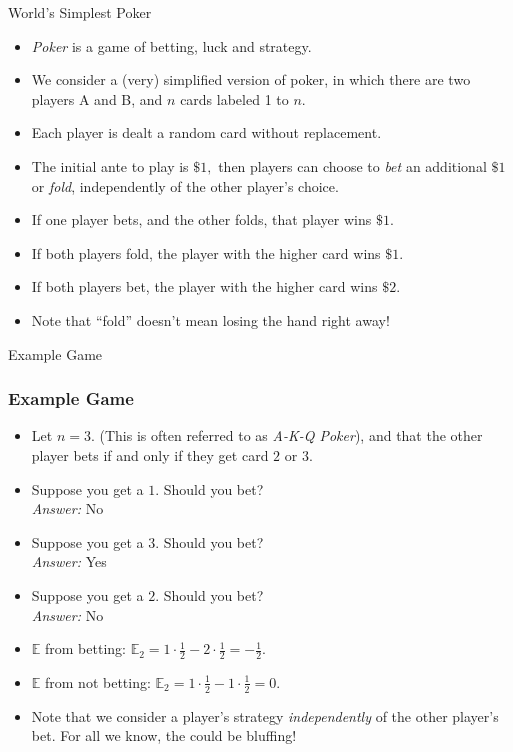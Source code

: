 \documentclass[aspectratio=169]{beamer}
\begin{document}
\begin{frame}{World's Simplest Poker}
    \begin{itemize}
        \item \textit{Poker} is a game of betting, luck and strategy. \pause
        \item 
         We consider a (very) simplified version of poker, in which there are two players A and B, and $n$ cards labeled 1 to $n.$\pause
        \item Each player is dealt a random card without replacement.\pause
        \item The initial ante to play is $\$1,$ then players can choose to \textit{bet} an additional $\$1$ or \textit{fold}, independently of the other player's choice.\pause
        \item If one player bets, and the other folds, that player wins $\$1.$ \pause
        \item If both players fold, the player with the higher card wins $\$1.$ \pause
        \item If both players bet, the player with the higher card wins $\$2.$ \pause
        \item Note that ``fold'' doesn't mean losing the hand right away!
        
        
    \end{itemize}
\end{frame}
\begin{frame}{Example Game}
  \frametitle{Example Game}
  \begin{itemize}
  \item Let $n=3.$ (This is often referred to as \textit{A-K-Q Poker}), and that the other player bets if and only if they get card $2$ or $3.$ \pause
  \item Suppose you get a $1.$ Should you bet? \pause  
    \\ \textit{Answer:} No \pause
  \item Suppose you get a $3.$ Should you bet?  \pause
    \\ \textit{Answer:} Yes \pause
  \item Suppose you get a $2.$ Should you bet?  \pause 
    \\ \textit{Answer:} No \pause
  \item $\mathbb E$ from betting: $\mathbb{E}_2 = 1 \cdot \frac{1}{2} - 2\cdot \frac{1}{2} = -\frac{1}{2}.$
  \item $\mathbb E$ from not betting: $\mathbb{E}_2 = 1 \cdot \frac{1}{2} - 1\cdot \frac{1}{2} = 0.$
  \pause
  \item Note that we consider a player's strategy \textit{independently} of the other player's bet. For all we know, the could be bluffing!
\end{itemize}
\end{frame}
\end{document}
